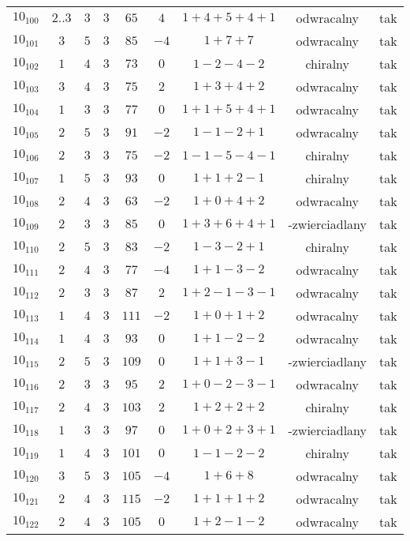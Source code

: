 \begin{longtable}{ccccccccc}
$10_{100}$ & $2..3$ & $3$ & $3$ & $65$ & $4$ & $1+4+5+4+1$ & odwracalny & tak \\
$10_{101}$ & $3$ & $5$ & $3$ & $85$ & $-4$ & $1+7+7$ & odwracalny & tak \\
$10_{102}$ & $1$ & $4$ & $3$ & $73$ & $0$ & $1-2-4-2$ & chiralny & tak \\
$10_{103}$ & $3$ & $4$ & $3$ & $75$ & $2$ & $1+3+4+2$ & odwracalny & tak \\
$10_{104}$ & $1$ & $3$ & $3$ & $77$ & $0$ & $1+1+5+4+1$ & odwracalny & tak \\
$10_{105}$ & $2$ & $5$ & $3$ & $91$ & $-2$ & $1-1-2+1$ & odwracalny & tak \\
$10_{106}$ & $2$ & $3$ & $3$ & $75$ & $-2$ & $1-1-5-4-1$ & chiralny & tak \\
$10_{107}$ & $1$ & $5$ & $3$ & $93$ & $0$ & $1+1+2-1$ & chiralny & tak \\
$10_{108}$ & $2$ & $4$ & $3$ & $63$ & $-2$ & $1+0+4+2$ & odwracalny & tak \\
$10_{109}$ & $2$ & $3$ & $3$ & $85$ & $0$ & $1+3+6+4+1$ & -zwierciadlany & tak \\
$10_{110}$ & $2$ & $5$ & $3$ & $83$ & $-2$ & $1-3-2+1$ & chiralny & tak \\
$10_{111}$ & $2$ & $4$ & $3$ & $77$ & $-4$ & $1+1-3-2$ & odwracalny & tak \\
$10_{112}$ & $2$ & $3$ & $3$ & $87$ & $2$ & $1+2-1-3-1$ & odwracalny & tak \\
$10_{113}$ & $1$ & $4$ & $3$ & $111$ & $-2$ & $1+0+1+2$ & odwracalny & tak \\
$10_{114}$ & $1$ & $4$ & $3$ & $93$ & $0$ & $1+1-2-2$ & odwracalny & tak \\
$10_{115}$ & $2$ & $5$ & $3$ & $109$ & $0$ & $1+1+3-1$ & -zwierciadlany & tak \\
$10_{116}$ & $2$ & $3$ & $3$ & $95$ & $2$ & $1+0-2-3-1$ & odwracalny & tak \\
$10_{117}$ & $2$ & $4$ & $3$ & $103$ & $2$ & $1+2+2+2$ & chiralny & tak \\
$10_{118}$ & $1$ & $3$ & $3$ & $97$ & $0$ & $1+0+2+3+1$ & -zwierciadlany & tak \\
$10_{119}$ & $1$ & $4$ & $3$ & $101$ & $0$ & $1-1-2-2$ & chiralny & tak \\
$10_{120}$ & $3$ & $5$ & $3$ & $105$ & $-4$ & $1+6+8$ & odwracalny & tak \\
$10_{121}$ & $2$ & $4$ & $3$ & $115$ & $-2$ & $1+1+1+2$ & odwracalny & tak \\
$10_{122}$ & $2$ & $4$ & $3$ & $105$ & $0$ & $1+2-1-2$ & odwracalny & tak \\

\end{longtable}
